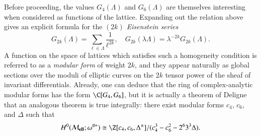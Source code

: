 \begin{remark}\label{MFRemark}
Before proceeding, the values $G_4(\Lambda)$ and $G_6(\Lambda)$ are themselves interesting when considered as functions of the lattice.  Expanding out the relation above gives an explicit formula for the \textit{$(2k)${\th} Eisenstein series} \[G_{2k}(\Lambda) = \sum_{\ell \in \Lambda} \frac{1}{\ell^{2k}}, \quad G_{2k}(\lambda \Lambda) = \lambda^{-2k} G_{2k}(\Lambda).\]  A function on the space of lattices which satisfies such a homogeneity condition is referred to as a \textit{modular form} of weight $2k$, and they appear naturally as global sections over the moduli of elliptic curves on the $2k${\th} tensor power of the sheaf of invariant differentials.  Already, one can deduce that the ring of complex-analytic modular forms has the form $\C[G_4, G_6]$, but it is actually a theorem of Deligne that an analogous theorem is true integrally: there exist modular forms $c_4$, $c_6$, and $\Delta$ such that \[H^0(\moduli{ell}; \omega^{\otimes *}) \cong \Z[c_4, c_6, \Delta^{\pm}] / (c_4^3 - c_6^2 - 2^6 3^3 \Delta).\]
\end{remark}

